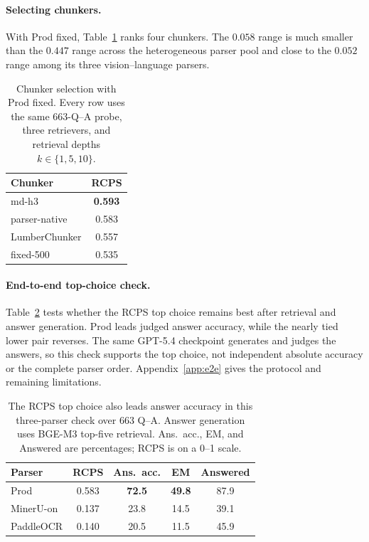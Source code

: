\documentclass[11pt]{article}
\newcommand{\rcps}{\textnormal{\textsc{RCPS}}}
\begin{document}
\paragraph{Selecting chunkers.} With Prod fixed, Table~\ref{tab:chunker-selection} ranks four chunkers. The $0.058$ range is much smaller than the $0.447$ range across the heterogeneous parser pool and close to the $0.052$ range among its three vision--language parsers.

\begin{table}[t]
\centering\footnotesize
\setlength{\tabcolsep}{7pt}
\begin{tabular}{lc}
\toprule
Chunker & \rcps{} \\
\midrule
md-h3 & \textbf{0.593} \\
parser-native & 0.583 \\
LumberChunker \citep{duarte2024lumber} & 0.557 \\
fixed-500 & 0.535 \\
\bottomrule
\end{tabular}
\caption{Chunker selection with Prod fixed. Every row uses the same 663-Q--A probe, three retrievers, and retrieval depths $k\in\{1,5,10\}$.}
\label{tab:chunker-selection}
\end{table}

\paragraph{End-to-end top-choice check.} Table~\ref{tab:e2e} tests whether the \rcps{} top choice remains best after retrieval and answer generation. Prod leads judged answer accuracy, while the nearly tied lower pair reverses. The same GPT-5.4 checkpoint generates and judges the answers, so this check supports the top choice, not independent absolute accuracy or the complete parser order. Appendix~\ref{app:e2e} gives the protocol and remaining limitations.

\begin{table}[t]
\centering\footnotesize
\setlength{\tabcolsep}{3pt}
\begin{tabular}{lcccc}
\toprule
Parser & \rcps{} & Ans.\ acc. & EM & Answered \\
\midrule
Prod & 0.583 & \textbf{72.5} & \textbf{49.8} & 87.9 \\
MinerU-on & 0.137 & 23.8 & 14.5 & 39.1 \\
PaddleOCR & 0.140 & 20.5 & 11.5 & 45.9 \\
\bottomrule
\end{tabular}
\caption{The \rcps{} top choice also leads answer accuracy in this three-parser check over 663 Q--A. Answer generation uses BGE-M3 top-five retrieval. Ans.\ acc., EM, and Answered are percentages; \rcps{} is on a 0--1 scale.}
\label{tab:e2e}
\end{table}
\end{document}
